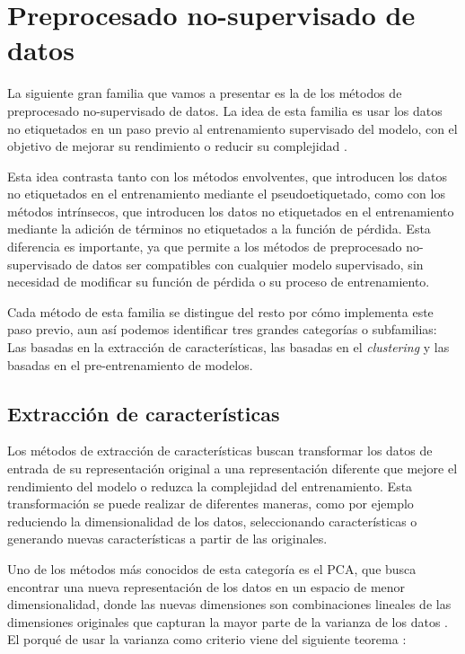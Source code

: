 \chapter{Preprocesado no-supervisado de datos}

La siguiente gran familia que vamos a presentar es la de los métodos de preprocesado no-supervisado de datos. La idea de esta familia es usar los datos no etiquetados en un paso previo al entrenamiento supervisado del modelo, con el objetivo de mejorar su rendimiento o reducir su complejidad \cite{van2020survey}.

Esta idea contrasta tanto con los métodos envolventes, que introducen los datos no etiquetados en el entrenamiento mediante el pseudoetiquetado, como con los métodos intrínsecos, que introducen los datos no etiquetados en el entrenamiento mediante la adición de términos no etiquetados a la función de pérdida. Esta diferencia es importante, ya que permite a los métodos de preprocesado no-supervisado de datos ser compatibles con cualquier modelo supervisado, sin necesidad de modificar su función de pérdida o su proceso de entrenamiento.

Cada método de esta familia se distingue del resto por cómo implementa este paso previo, aun así podemos identificar tres grandes categorías o subfamilias: Las basadas en la extracción de características, las basadas en el \textit{clustering} y las basadas en el pre-entrenamiento de modelos.

\section{Extracción de características}

Los métodos de extracción de características buscan transformar los datos de entrada de su representación original a una representación diferente que mejore el rendimiento del modelo o reduzca la complejidad del entrenamiento. Esta transformación se puede realizar de diferentes maneras, como por ejemplo reduciendo la dimensionalidad de los datos, seleccionando características o generando nuevas características a partir de las originales. 

Uno de los métodos más conocidos de esta categoría es el \gls{PCA}, que busca encontrar una nueva representación de los datos en un espacio de menor dimensionalidad, donde las nuevas dimensiones son combinaciones lineales de las dimensiones originales que capturan la mayor parte de la varianza de los datos \cite{abdi2010principal}. El porqué de usar la varianza como criterio viene del siguiente teorema \cite{burges2010geometric}:

